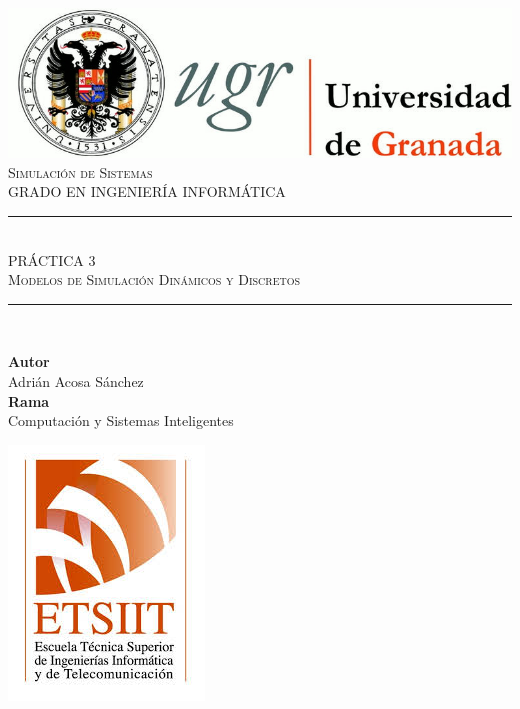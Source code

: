 \documentclass[11pt,a4paper]{report}
\newcommand{\asignatura}{Simulación de Sistemas}
\newcommand{\autor}{Adrián Acosa Sánchez}
\newcommand{\titulo}{PRÁCTICA 3}
\newcommand{\subtitulo}{Modelos de Simulación Dinámicos y Discretos}
\newcommand{\rama}{Computación y Sistemas Inteligentes}
\begin{document}

\begin{titlepage}

\begin{minipage}{\textwidth}

\centering

\includegraphics[scale=0.3]{img/logo_ugr.jpg}\\[1cm]

\textsc{\Large \asignatura{}\\[0.2cm]}
\textsc{GRADO EN INGENIERÍA INFORMÁTICA}\\[1cm]

\noindent\rule[-1ex]{\textwidth}{1pt}\\[1.5ex]
\textsc{{\Huge \titulo\\[0.5ex]}}
\textsc{{\Large \subtitulo\\}}
\noindent\rule[-1ex]{\textwidth}{2pt}\\[3.5ex]

\end{minipage}

\vspace{0.7cm}

\begin{minipage}{\textwidth}

\centering

\textbf{Autor}\\ {\autor{}}\\[2.5ex]
\textbf{Rama}\\ {\rama}\\[2.5ex]
\vspace{0.3cm}

\includegraphics[scale=0.3]{img/etsiit.jpeg}


\end{minipage}
\end{titlepage}
\end{document}
